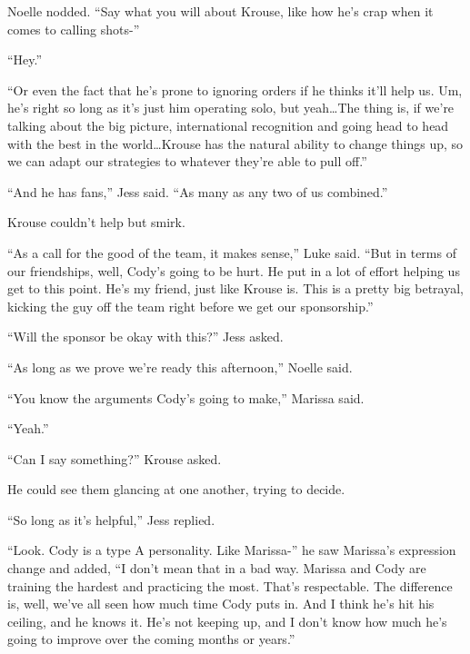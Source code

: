 Noelle nodded.  ``Say what you will about Krouse, like how he's crap when it comes to calling shots-''



``Hey.''



``Or even the fact that he's prone to ignoring orders if he thinks it'll help us.  Um, he's right so long as it's just him operating solo, but yeah\ldots The thing is, if we're talking about the big picture, international recognition and going head to head with the best in the world\ldots Krouse has the natural ability to change things up, so we can adapt our strategies to whatever they're able to pull off.''



``And he has fans,'' Jess said.  ``As many as any two of us combined.''



Krouse couldn't help but smirk.



``As a call for the good of the team, it makes sense,'' Luke said.  ``But in terms of our friendships, well, Cody's going to be hurt.  He put in a lot of effort helping us get to this point.  He's my friend, just like Krouse is.  This is a pretty big betrayal, kicking the guy off the team right before we get our sponsorship.''



``Will the sponsor be okay with this?'' Jess asked.



``As long as we prove we're ready this afternoon,'' Noelle said.



``You know the arguments Cody's going to make,'' Marissa said.



``Yeah.''



``Can I say something?''  Krouse asked.



He could see them glancing at one another, trying to decide.



``So long as it's helpful,'' Jess replied.



``Look.  Cody is a type A personality.  Like Marissa-'' he saw Marissa's expression change and added, ``I don't mean that in a bad way.  Marissa and Cody are training the hardest and practicing the most.  That's respectable.  The difference is, well, we've all seen how much time Cody puts in.  And I think he's hit his ceiling, and he knows it.  He's not keeping up, and I don't know how much he's going to improve over the coming months or years.''



